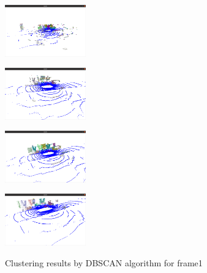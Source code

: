 \documentclass[8pt]{article}
\theoremstyle{nonumberplain}
\begin{document}
\begin{figure}[H]
	\centering
	\begin{minipage}[t]{0.24\textwidth}
		\centering
		\includegraphics[width=3.5cm]{fig3a.png}
		\label{fig3a}
	\end{minipage}
	\begin{minipage}[t]{0.24\textwidth}
		\centering
		\includegraphics[width=3.5cm]{fig3b.png}
		\label{fig3b}
	\end{minipage}
	\begin{minipage}[t]{0.24\textwidth}
		\centering
		\includegraphics[width=3.5cm]{fig3c.png}
		\label{fig3c}
	\end{minipage}
	\begin{minipage}[t]{0.24\textwidth}
		\centering
		\includegraphics[width=3.5cm]{fig3d.png}
		\label{fig3d}
	\end{minipage}
	\caption{Clustering results by DBSCAN algorithm for frame1}
	\label{fig3}
\end{figure} 
\end{document}
